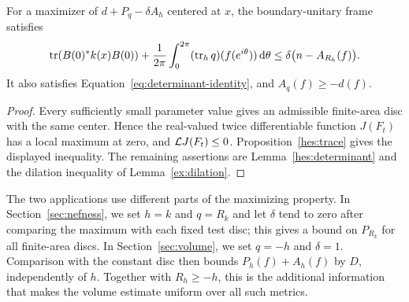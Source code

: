 \begin{corollary}\label{hes:maximum}
For a maximizer of $d+P_q-\delta A_h$ centered at $x$, the
boundary-unitary frame satisfies
\begin{equation}\label{eq:maximum-inequality}
 \operatorname{tr}(B(0)^*k(x)B(0))
 +\frac1{2\pi}\int_0^{2\pi}(\operatorname{tr}_hq)(f(e^{i\theta}))\,\mathrm d\theta
 \le\delta\bigl(n-A_{R_h}(f)\bigr).
\end{equation}
It also satisfies Equation~\eqref{eq:determinant-identity}, and
$A_q(f)\ge-d(f)$.
\end{corollary}

\begin{proof}
Every sufficiently small parameter value gives an admissible
finite-area disc with the same center. Hence the real-valued twice
differentiable function $J(F_t)$ has a local maximum at zero, and
$\mathcal L J(F_t)\le0$. Proposition~\ref{hes:trace} gives the displayed
inequality. The remaining assertions are Lemma~\ref{hes:determinant}
and the dilation inequality of Lemma~\ref{ex:dilation}.
\end{proof}

The two applications use different parts of the maximizing property.
In Section~\ref{sec:nefness}, we set $h=k$ and $q=R_k$ and let
$\delta$ tend to zero after comparing the maximum with each fixed test
disc; this gives a bound on $P_{R_k}$ for all finite-area discs.
In Section~\ref{sec:volume}, we set $q=-h$ and $\delta=1$.
Comparison with the constant disc then bounds $P_h(f)+A_h(f)$ by
$D$, independently of $h$. Together with $R_h\ge-h$, this is the
additional information that makes the volume estimate uniform over
all such metrics.
